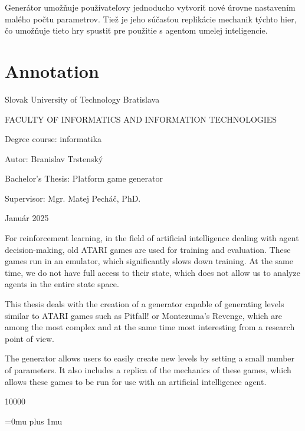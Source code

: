\documentclass[11pt,slovak,a4paper]{article}
\begin{document}
Generátor umožňuje používateľovy jednoducho vytvoriť nové úrovne nastavením malého počtu parametrov. Tiež je jeho súčasťou replikácie mechanik týchto hier, čo umožňuje tieto hry spustiť pre použitie s agentom umelej inteligencie. 

\newpage

\null \thispagestyle{empty}

\newpage

\section*{Annotation}

Slovak University of Technology Bratislava

FACULTY OF INFORMATICS AND INFORMATION TECHNOLOGIES


Degree course: \tab informatika

Autor: \tab Branislav Trstenský

Bachelor's Thesis: \tab Platform game generator

Supervisor: \tab Mgr. Matej Pecháč, PhD.

Január 2025

For reinforcement learning, in the field of artificial intelligence dealing with agent decision-making, old ATARI games are used for training and evaluation. These games run in an emulator, which significantly slows down training. At the same time, we do not have full access to their state, which does not allow us to analyze agents in the entire state space.

This thesis deals with the creation of a generator capable of generating levels similar to ATARI games such as Pitfall! or Montezuma's Revenge, which are among the most complex and at the same time most interesting from a research point of view.

The generator allows users to easily create new levels by setting a small number of parameters. It also includes a replica of the mechanics of these games, which allows these games to be run for use with an artificial intelligence agent.

\newpage

\null \thispagestyle{empty}

\newpage

\thispagestyle{plain}
\tableofcontents

\newpage

\null \thispagestyle{empty}

\newpage

\setcounter{page}{1}

 10000


\newpage

\Urlmuskip=0mu plus 1mu
\def\UrlBreaks{\do\/\do-}



\end{document}
